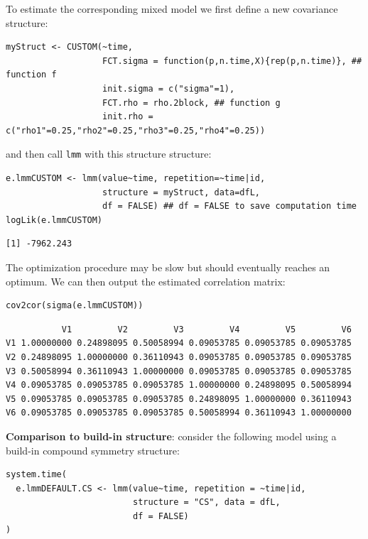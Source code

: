 \documentclass[12pt]{article}
\begin{document}
\clearpage

To estimate the corresponding mixed model we first define a new
covariance structure:
\lstset{language=r,label= ,caption= ,captionpos=b,numbers=none}
\begin{lstlisting}
myStruct <- CUSTOM(~time,
                   FCT.sigma = function(p,n.time,X){rep(p,n.time)}, ## function f
                   init.sigma = c("sigma"=1),
                   FCT.rho = rho.2block, ## function g
                   init.rho = c("rho1"=0.25,"rho2"=0.25,"rho3"=0.25,"rho4"=0.25))
\end{lstlisting}

and then call \texttt{lmm} with this structure structure:
\lstset{language=r,label= ,caption= ,captionpos=b,numbers=none}
\begin{lstlisting}
e.lmmCUSTOM <- lmm(value~time, repetition=~time|id,
                   structure = myStruct, data=dfL,
                   df = FALSE) ## df = FALSE to save computation time
logLik(e.lmmCUSTOM)
\end{lstlisting}

\begin{verbatim}
[1] -7962.243
\end{verbatim}


The optimization procedure may be slow but should eventually reaches
an optimum. We can then output the estimated correlation matrix:
\lstset{language=r,label= ,caption= ,captionpos=b,numbers=none}
\begin{lstlisting}
cov2cor(sigma(e.lmmCUSTOM))
\end{lstlisting}

\begin{verbatim}
           V1         V2         V3         V4         V5         V6
V1 1.00000000 0.24898095 0.50058994 0.09053785 0.09053785 0.09053785
V2 0.24898095 1.00000000 0.36110943 0.09053785 0.09053785 0.09053785
V3 0.50058994 0.36110943 1.00000000 0.09053785 0.09053785 0.09053785
V4 0.09053785 0.09053785 0.09053785 1.00000000 0.24898095 0.50058994
V5 0.09053785 0.09053785 0.09053785 0.24898095 1.00000000 0.36110943
V6 0.09053785 0.09053785 0.09053785 0.50058994 0.36110943 1.00000000
\end{verbatim}


\textbf{Comparison to build-in structure}: consider the following model using
a build-in compound symmetry structure:
\lstset{language=r,label= ,caption= ,captionpos=b,numbers=none}
\begin{lstlisting}
system.time(
  e.lmmDEFAULT.CS <- lmm(value~time, repetition = ~time|id,
                         structure = "CS", data = dfL,
                         df = FALSE)
)
\end{lstlisting}
\end{document}
